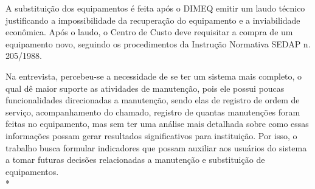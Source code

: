 A substituição dos equipamentos é feita após o DIMEQ emitir um laudo técnico justificando a impossibilidade da recuperação do equipamento e a inviabilidade econômica. Após o laudo, o Centro de Custo deve requisitar a compra de um equipamento novo, seguindo os procedimentos da Instrução Normativa SEDAP n. 205/1988.

Na entrevista, percebeu-se a necessidade de se ter um sistema mais completo, o qual dê maior suporte as atividades de manutenção, pois ele possui poucas funcionalidades direcionadas a manutenção, sendo elas de registro de ordem de serviço, acompanhamento do chamado, registro de quantas manutenções foram feitas no equipamento, mas sem ter uma análise mais detalhada sobre como essas informações possam gerar resultados significativos para instituição. Por isso, o trabalho busca formular indicadores que possam auxiliar aos usuários do sistema a tomar futuras decisões relacionadas a manutenção e substituição de equipamentos. \\*



